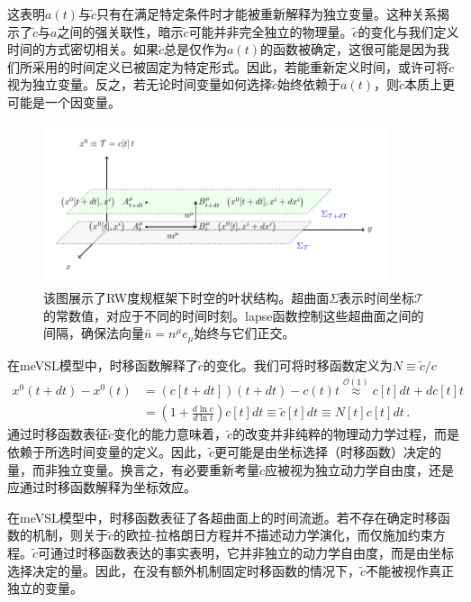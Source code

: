 \documentclass[jkps,preprint,fleqn]{revtex4}
\newcommand{\tc}{\tilde{c}}
\begin{document}
\begin{CJK*}{UTF8}{gbsn}
这表明$a(t)$与$\tc$只有在满足特定条件时才能被重新解释为独立变量。这种关系揭示了$\tc$与$a$之间的强关联性，暗示$\tc$可能并非完全独立的物理量。$\tc$的变化与我们定义时间的方式密切相关。如果$\tc$总是仅作为$a(t)$的函数被确定，这很可能是因为我们所采用的时间定义已被固定为特定形式。因此，若能重新定义时间，或许可将$\tc$视为独立变量。反之，若无论时间变量如何选择$\tc$始终依赖于$a(t)$，则$\tc$本质上更可能是一个因变量。

\begin{figure}
	\begin{center}
	\includegraphics[width=0.9\textwidth]{Fig2.pdf}
	\caption{该图展示了RW度规框架下时空的叶状结构。超曲面$\Sigma$表示时间坐标$\mathcal{T}$的常数值，对应于不同的时间时刻。lapse函数控制这些超曲面之间的间隔，确保法向量$\bar{n} = n^{\mu} e_{\mu}$始终与它们正交。}
	\label{Fig2}
	\end{center}
\end{figure}

在meVSL模型中，时移函数解释了$\tc$的变化。我们可将时移函数定义为$N \equiv \tc/c$
\begin{align}
x^{0}(t+dt) - x^{0}(t) &=  \left( c[t+dt] \right) \left( t+dt \right) - c(t) t \overset{\mathcal{O}(1)}{\approx} c[t] dt + dc[t] t \nonumber \\
	&= \left( 1 + \frac{d \ln c}{d \ln t} \right) c[t] dt \equiv \tilde{c}[t] dt \equiv N[t] c[t] dt \label{NmeVSL} \,.
\end{align}
通过时移函数表征$\tc$变化的能力意味着，$\tc$的改变并非纯粹的物理动力学过程，而是依赖于所选时间变量的定义。因此，$\tc$更可能是由坐标选择（时移函数）决定的量，而非独立变量。换言之，有必要重新考量$\tc$应被视为独立动力学自由度，还是应通过时移函数解释为坐标效应。

在meVSL模型中，时移函数表征了各超曲面上的时间流逝。若不存在确定时移函数的机制，则关于$\tc$的欧拉-拉格朗日方程并不描述动力学演化，而仅施加约束方程。$\tc$可通过时移函数表达的事实表明，它并非独立的动力学自由度，而是由坐标选择决定的量。因此，在没有额外机制固定时移函数的情况下，$\tc$不能被视作真正独立的变量。


\end{CJK*}
\end{document}
